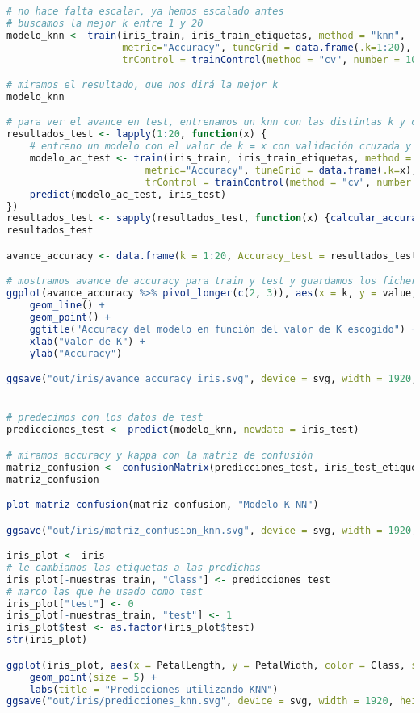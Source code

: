 \begin{lstlisting}[language=R]
# no hace falta escalar, ya hemos escalado antes
# buscamos la mejor k entre 1 y 20
modelo_knn <- train(iris_train, iris_train_etiquetas, method = "knn",
					metric="Accuracy", tuneGrid = data.frame(.k=1:20),
					trControl = trainControl(method = "cv", number = 10))

# miramos el resultado, que nos dirá la mejor k
modelo_knn

# para ver el avance en test, entrenamos un knn con las distintas k y calculamos su accuracy en test
resultados_test <- lapply(1:20, function(x) {
	# entreno un modelo con el valor de k = x con validación cruzada y predigo con ese modelo
	modelo_ac_test <- train(iris_train, iris_train_etiquetas, method = "knn",
						metric="Accuracy", tuneGrid = data.frame(.k=x),
						trControl = trainControl(method = "cv", number = 10))
	predict(modelo_ac_test, iris_test)
})
resultados_test <- sapply(resultados_test, function(x) {calcular_accuracy(iris_test_etiquetas, x)})
resultados_test

avance_accuracy <- data.frame(k = 1:20, Accuracy_test = resultados_test, Accuracy_train = modelo_knn$results$Accuracy)

# mostramos avance de accuracy para train y test y guardamos los ficheros
ggplot(avance_accuracy %>% pivot_longer(c(2, 3)), aes(x = k, y = value, color = name)) +
	geom_line() +
	geom_point() +
	ggtitle("Accuracy del modelo en función del valor de K escogido") +
	xlab("Valor de K") +
	ylab("Accuracy")

ggsave("out/iris/avance_accuracy_iris.svg", device = svg, width = 1920, height = 1080, units = "px", dpi = 150)


# predecimos con los datos de test
predicciones_test <- predict(modelo_knn, newdata = iris_test)

# miramos accuracy y kappa con la matriz de confusión
matriz_confusion <- confusionMatrix(predicciones_test, iris_test_etiquetas)
matriz_confusion

plot_matriz_confusion(matriz_confusion, "Modelo K-NN")

ggsave("out/iris/matriz_confusion_knn.svg", device = svg, width = 1920, height = 1080, units = "px", dpi = 150)

iris_plot <- iris
# le cambiamos las etiquetas a las predichas
iris_plot[-muestras_train, "Class"] <- predicciones_test
# marco las que he usado como test
iris_plot["test"] <- 0
iris_plot[-muestras_train, "test"] <- 1
iris_plot$test <- as.factor(iris_plot$test)
str(iris_plot)

ggplot(iris_plot, aes(x = PetalLength, y = PetalWidth, color = Class, shape = test)) +
	geom_point(size = 5) +
	labs(title = "Predicciones utilizando KNN")
ggsave("out/iris/predicciones_knn.svg", device = svg, width = 1920, height = 1080, units = "px", dpi = 150)




\end{lstlisting}
